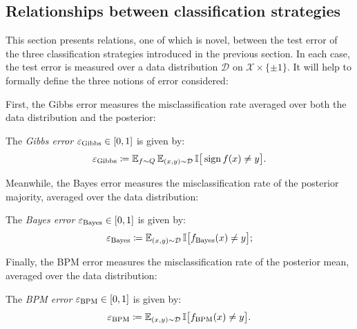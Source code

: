 \begin{refsection}
\section{Relationships between classification strategies}

This section presents relations, one of which is novel, between the test error of the three classification strategies introduced in the previous section. In each case, the test error is measured over a data distribution $\mathcal{D}$ on $\mathcal{X}\times\{\pm1\}$. It will help to formally define the three notions of error considered:

First, the Gibbs error measures the misclassification rate averaged over both the data distribution and the posterior:
\begin{definition} The \textit{Gibbs error} $\varepsilon_{\mathrm{Gibbs}}\in[0,1]$ is given by:
    \begin{equation}
        \varepsilon_{\mathrm{Gibbs}} \coloneqq \operatorname{\mathbb{E}}_{f\sim Q} \operatorname{\mathbb{E}}_{(x,y)\sim\mathcal{D}}\mathbb{I}\big[\operatorname{sign} f(x)\neq y\big].
    \end{equation}
\end{definition}

Meanwhile, the Bayes error measures the misclassification rate of the posterior majority, averaged over the data distribution:
\begin{definition}The \textit{Bayes error} $\varepsilon_{\mathrm{Bayes}} \in [0,1]$ is given by:
    \begin{equation}
        \varepsilon_{\mathrm{Bayes}} \coloneqq \operatorname{\mathbb{E}}_{(x,y)\sim\mathcal{D}}\mathbb{I}\big[f_\mathrm{Bayes}(x)\neq y\big];
    \end{equation}
\end{definition}

Finally, the BPM error measures the misclassification rate of the posterior mean, averaged over the data distribution:
\begin{definition}The \textit{BPM error} $\varepsilon_{\mathrm{BPM}}\in[0,1]$ is given by:
    \begin{equation}
        \varepsilon_{\mathrm{BPM}} \coloneqq \operatorname{\mathbb{E}}_{(x,y)\sim\mathcal{D}}\mathbb{I}\big[f_\mathrm{BPM}(x)\neq y\big].
    \end{equation}
\end{definition}


\end{refsection}

